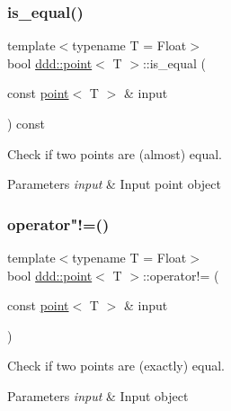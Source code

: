\subsubsection{\texorpdfstring{is\+\_\+equal()}{is\_equal()}}
{\footnotesize\ttfamily template$<$typename T = Float$>$ \\
bool \hyperlink{classddd_1_1point}{ddd\+::point}$<$ T $>$\+::is\+\_\+equal (\begin{DoxyParamCaption}\item[{const \hyperlink{classddd_1_1point}{point}$<$ T $>$ \&}]{input }\end{DoxyParamCaption}) const\hspace{0.3cm}{\ttfamily [inline]}}



Check if two points are (almost) equal. 


\begin{DoxyParams}{Parameters}
{\em input} & Input point object \\
\hline
\end{DoxyParams}
\mbox{\label{classddd_1_1point_a2567b8c3cd08d965e70033f3f4a8d3db}} 
\subsubsection{\texorpdfstring{operator"!=()}{operator!=()}}
{\footnotesize\ttfamily template$<$typename T = Float$>$ \\
bool \hyperlink{classddd_1_1point}{ddd\+::point}$<$ T $>$\+::operator!= (\begin{DoxyParamCaption}\item[{const \hyperlink{classddd_1_1point}{point}$<$ T $>$ \&}]{input }\end{DoxyParamCaption})\hspace{0.3cm}{\ttfamily [inline]}}



Check if two points are (exactly) equal. 


\begin{DoxyParams}{Parameters}
{\em input} & Input object \\
\hline
\end{DoxyParams}
\mbox{\label{classddd_1_1point_a4291cf7411bd02324731a13143d718c6}} 
